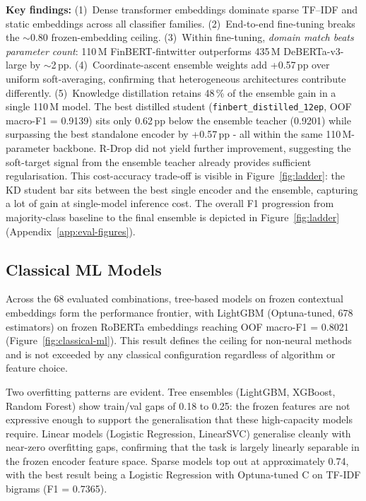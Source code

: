 \documentclass[11pt,a4paper]{article}
\newcommand{\kdF}{0.9139}
\begin{document}
\textbf{Key findings:}
(1)~Dense transformer embeddings dominate sparse TF--IDF and static embeddings across
all classifier families.
(2)~End-to-end fine-tuning breaks the $\sim$0.80 frozen-embedding ceiling.
(3)~Within fine-tuning, \emph{domain match beats parameter count}: 110\,M FinBERT-fintwitter
outperforms 435\,M DeBERTa-v3-large by $\sim$2\,pp.
(4)~Coordinate-ascent ensemble weights add +0.57\,pp over uniform soft-averaging,
confirming that heterogeneous architectures contribute differently.
(5)~Knowledge distillation retains 48\,\% of the ensemble gain in a single 110\,M model. The best distilled student (\texttt{finbert\_distilled\_12ep}, OOF macro-F1 = \kdF{}) sits
only 0.62\,pp below the ensemble teacher (0.9201) while surpassing the best standalone
encoder by +0.57\,pp - all within the same 110\,M-parameter backbone. R-Drop did not
yield further improvement, suggesting the soft-target signal from the ensemble teacher
already provides sufficient regularisation. This cost-accuracy trade-off is visible in
Figure~\ref{fig:ladder}: the KD student bar sits between the best single encoder and the
ensemble, capturing a lot of gain at single-model inference cost. The overall F1 progression from majority-class baseline to the final ensemble is depicted
in Figure~\ref{fig:ladder} (Appendix~\ref{app:eval-figures}).

\subsection{Classical ML Models}
Across the 68 evaluated combinations, tree-based models on frozen contextual embeddings form the performance frontier, with LightGBM (Optuna-tuned, 678 estimators) on frozen RoBERTa embeddings reaching OOF macro-F1 = 0.8021 (Figure~\ref{fig:classical-ml}). This result defines the ceiling for non-neural methods and is not exceeded by any classical configuration regardless of algorithm or feature choice.

Two overfitting patterns are evident. Tree ensembles (LightGBM, XGBoost, Random Forest) show train/val gaps of 0.18 to 0.25: the frozen features are not expressive enough to support the generalisation that these high-capacity models require. Linear models (Logistic Regression, LinearSVC) generalise cleanly with near-zero overfitting gaps, confirming that the task is largely linearly separable in the frozen encoder feature space. Sparse models top out at approximately 0.74, with the best result being a Logistic Regression with Optuna-tuned C on TF-IDF bigrams (F1 = 0.7365).
\end{document}
